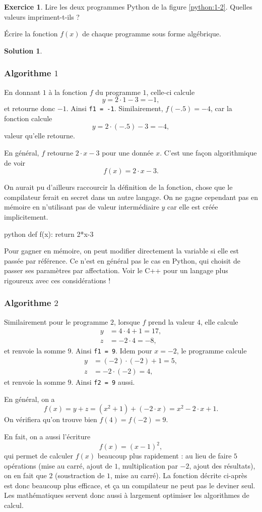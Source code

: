 \documentclass[a4paper, 14pt]{extarticle}
\theoremstyle{plain}
\newtheorem*{sol}{Solution}
\theoremstyle{definition}
\newtheorem{ex}{Exercice}
\newif\ifsolutions
\newcommand{\exe}[2]{
		\begin{ex} #1  \end{ex}
		\begin{sol} #2 \end{sol}
	}
\newcommand{\exe}[2]{
		\begin{ex} #1  \end{ex}
	}
\begin{document}
	\exe{
		Lire les deux programmes Python de la figure \ref{python:1-2}.
		Quelles valeurs impriment-t-ils ?
		
		Écrire la fonction $f(x)$ de chaque programme sous forme algébrique.
	}{}{
	
	\subsubsection*{Algorithme $1$}
	
		En donnant $1$ à la fonction $f$ du programme $1$, celle-ci calcule
			\[ y = 2\cdot 1 - 3 = -1, \]
		et retourne donc $-1$.
		Ainsi \texttt{f1 = -1}.
		Similairement, $f(-.5) = -4$, car la fonction calcule
			\[ y = 2 \cdot (-.5) - 3 = -4, \]
		valeur qu'elle retourne.
		
		En général, $f$ retourne $2\cdot x-3$ pour une donnée $x$.
		C'est une façon algorithmique de voir
			\[ f(x) = 2\cdot x - 3. \]
		
		On aurait pu d'ailleurs raccourcir la définition de la fonction, chose que le compilateur ferait en secret dans un autre langage.
		On ne gagne cependant pas en mémoire en n'utilisant pas de valeur intermédiaire $y$ car elle est créée implicitement.
\begin{mintedbox}{python}
def f(x):
    return 2*x-3
\end{mintedbox}
		Pour gagner en mémoire, on peut modifier directement la variable si elle est passée par référence. 
		Ce n'est en général pas le cas en Python, qui choisit de passer ses paramètres par affectation.
		Voir le C++ pour un langage plus rigoureux avec ces considérations !
	
	\subsubsection*{Algorithme $2$}
		
		Similairement pour le programme $2$, lorsque $f$ prend la valeur $4$, elle calcule
			\begin{align*}
				y &= 4\cdot4 + 1 = 17, \\
				z &= -2\cdot 4 = -8,
			\end{align*}
		et renvoie la somme $9$.
		Ainsi \texttt{f1 = 9}.
		Idem pour $x=-2$, le programme calcule
			\begin{align*}
				y &= (-2)\cdot(-2) + 1 = 5, \\
				z &= -2\cdot (-2) = 4,
			\end{align*}
		et renvoie la somme $9$. Ainsi \texttt{f2 = 9} aussi.
		
		En général, on a 
			\[ f(x) = y + z = (x^2 + 1) + (-2\cdot x) = x^2 - 2\cdot x + 1. \]
		On vérifiera qu'on trouve bien $f(4) = f(-2) = 9$.
		
		En fait, on a aussi l'écriture 
			\[ f(x) = (x-1)^2, \]
		qui permet de calculer $f(x)$ beaucoup plus rapidement : au lieu de faire $5$ opérations (mise au carré, ajout de $1$, multiplication par $-2$, ajout des résultats), on en fait que $2$ (soustraction de $1$, mise au carré).
		La fonction décrite ci-après est donc beaucoup plus efficace, et ça un compilateur ne peut pas le deviner seul.
		Les mathématiques servent donc aussi à largement optimiser les algorithmes de calcul.
	}
\ifsolutions
\else
\newpage
\fi
\end{document}
